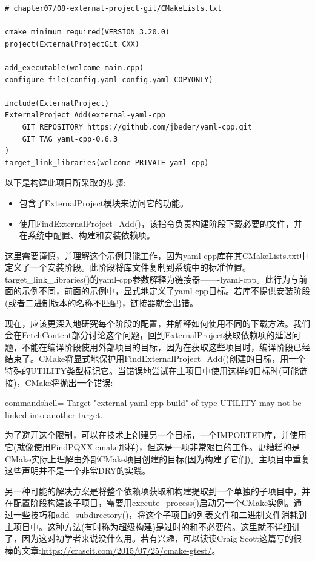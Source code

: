 \begin{lstlisting}[style=styleCMake]
# chapter07/08-external-project-git/CMakeLists.txt

cmake_minimum_required(VERSION 3.20.0)
project(ExternalProjectGit CXX)

add_executable(welcome main.cpp)
configure_file(config.yaml config.yaml COPYONLY)

include(ExternalProject)
ExternalProject_Add(external-yaml-cpp
	GIT_REPOSITORY https://github.com/jbeder/yaml-cpp.git
	GIT_TAG yaml-cpp-0.6.3
)
target_link_libraries(welcome PRIVATE yaml-cpp)
\end{lstlisting} 

以下是构建此项目所采取的步骤:

\begin{itemize}
\item 
包含了ExternalProject模块来访问它的功能。

\item 
使用FindExternalProject\_Add()，该指令负责构建阶段下载必要的文件，并在系统中配置、构建和安装依赖项。
\end{itemize}

这里需要谨慎，并理解这个示例只能工作，因为yaml-cpp库在其CMakeLists.txt中定义了一个安装阶段。此阶段将库文件复制到系统中的标准位置。target\_link\_libraries()的yaml-cpp参数解释为链接器——-lyaml-cpp。此行为与前面的示例不同，前面的示例中，显式地定义了yaml-cpp目标。若库不提供安装阶段(或者二进制版本的名称不匹配)，链接器就会出错。

现在，应该更深入地研究每个阶段的配置，并解释如何使用不同的下载方法。我们会在FetchContent部分讨论这个问题，回到ExternalProject获取依赖项的延迟问题，不能在编译阶段使用外部项目的目标，因为在获取这些项目时，编译阶段已经结束了。CMake将显式地保护用FindExternalProject\_Add()创建的目标，用一个特殊的UTILITY类型标记它。当错误地尝试在主项目中使用这样的目标时(可能链接)，CMake将抛出一个错误:

\begin{tcblisting}{commandshell={}}
Target "external-yaml-cpp-build" of type UTILITY may not be
linked into another target.
\end{tcblisting}

为了避开这个限制，可以在技术上创建另一个目标，一个IMPORTED库，并使用它(就像使用FindPQXX.cmake那样)，但这是一项非常艰巨的工作。更糟糕的是CMake实际上理解由外部CMake项目创建的目标(因为构建了它们)。主项目中重复这些声明并不是一个非常DRY的实践。

另一种可能的解决方案是将整个依赖项获取和构建提取到一个单独的子项目中，并在配置阶段构建该子项目，需要用execute\_process()启动另一个CMake实例。通过一些技巧和add\_subdirectory()，将这个子项目的列表文件和二进制文件消耗到主项目中。这种方法(有时称为超级构建)是过时的和不必要的。这里就不详细讲了，因为这对初学者来说没什么用。若有兴趣，可以读读Craig Scott这篇写的很棒的文章:\url{https://crascit.com/2015/07/25/cmake-gtest/}。

